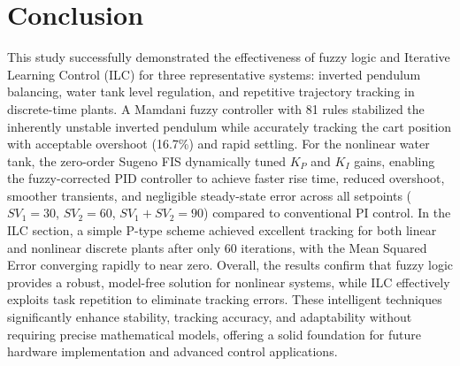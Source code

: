 \section*{Conclusion}
This study successfully demonstrated the effectiveness of fuzzy logic and Iterative Learning Control (ILC) for three representative systems: inverted pendulum balancing, water tank level regulation, and repetitive trajectory tracking in discrete-time plants. A Mamdani fuzzy controller with 81 rules stabilized the inherently unstable inverted pendulum while accurately tracking the cart position with acceptable overshoot (16.7\%) and rapid settling. For the nonlinear water tank, the zero-order Sugeno FIS dynamically tuned $K_P$ and $K_I$ gains, enabling the fuzzy-corrected PID controller to achieve faster rise time, reduced overshoot, smoother transients, and negligible steady-state error across all setpoints ($SV_1=30$, $SV_2=60$, $SV_1+SV_2=90$) compared to conventional PI control. In the ILC section, a simple P-type scheme achieved excellent tracking for both linear and nonlinear discrete plants after only 60 iterations, with the Mean Squared Error converging rapidly to near zero. Overall, the results confirm that fuzzy logic provides a robust, model-free solution for nonlinear systems, while ILC effectively exploits task repetition to eliminate tracking errors. These intelligent techniques significantly enhance stability, tracking accuracy, and adaptability without requiring precise mathematical models, offering a solid foundation for future hardware implementation and advanced control applications.
